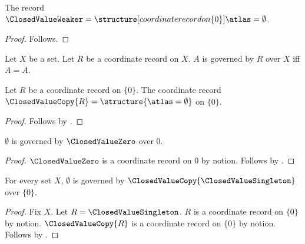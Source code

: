 \begin{instance}\label{closed_value_weaker}
    The record $\ClosedValueWeaker=\structure[coordinate record on \{0\}]{\atlas=\emptyset}$.
\end{instance}
\begin{proof}
    Follows.
\end{proof}

\begin{definition}\label{closed_value_guard}
    Let $X$ be a set.
    Let $R$ be a coordinate record on $X$.
    $A$ is governed by $R$ over $X$ iff $A=A$.
\end{definition}

\begin{construction}\label{closed_value_copy}
    Let $R$ be a coordinate record on $\{0\}$.
    The coordinate record $\ClosedValueCopy{R}=\structure{\atlas=\emptyset}$ on $\{0\}$.
\end{construction}
\begin{proof}
    Follows by .
\end{proof}

\begin{proposition}\label{closed_value_same_file}
    $\emptyset$ is governed by $\ClosedValueZero$ over $0$.
\end{proposition}
\begin{proof}
    $\ClosedValueZero$ is a coordinate record on $0$ by notion.
    Follows by .
\end{proof}

\begin{proposition}\label{closed_value_unused_outer_binder}
    For every set $X$, $\emptyset$ is governed by $\ClosedValueCopy{\ClosedValueSingleton}$ over $\{0\}$.
\end{proposition}
\begin{proof}
    Fix $X$.
    Let $R=\ClosedValueSingleton$.
    $R$ is a coordinate record on $\{0\}$ by notion.
    $\ClosedValueCopy{R}$ is a coordinate record on $\{0\}$ by notion.
    Follows by .
\end{proof}
